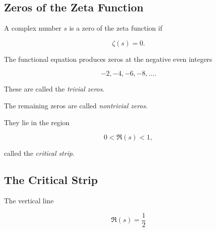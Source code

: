 \subsection{Zeros of the Zeta Function}
\label{subsec:zeta-zeros}

A complex number \(s\) is a zero of the zeta function if

\[ \zeta(s)=0. \]

The functional equation produces zeros at the negative even integers

\[ -2,-4,-6,-8,\ldots. \]

These are called the \emph{trivial zeros}.

The remaining zeros are called \emph{nontrivial zeros}.

They lie in the region

\[ 0<\Re(s)<1, \]

called the \emph{critical strip}.

\subsection{The Critical Strip}
\label{subsec:zeta-critical-strip}

\begin{centereddiagram}
\end{centereddiagram}

The vertical line

\[ \Re(s)=\frac12 \]

